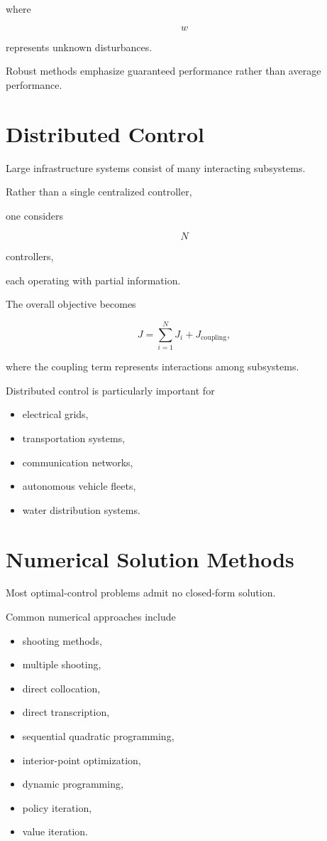 \documentclass[11pt,fleqn]{book}
\numberwithin{equation}{chapter}
\theoremstyle{plain}
\theoremstyle{definition}
\theoremstyle{remark}
\begin{document}
where

\[
w
\]

represents unknown disturbances.

Robust methods emphasize guaranteed performance rather than average
performance.


\section{Distributed Control}

Large infrastructure systems consist of many interacting subsystems.

Rather than a single centralized controller,

one considers

\[
N
\]

controllers,

each operating with partial information.

The overall objective becomes

\[
\boxed{
J
=
\sum_{i=1}^{N}
J_i
+
J_{\mathrm{coupling}},
}
\]

where the coupling term represents interactions among subsystems.

Distributed control is particularly important for

\begin{itemize}
\item electrical grids,
\item transportation systems,
\item communication networks,
\item autonomous vehicle fleets,
\item water distribution systems.
\end{itemize}


\section{Numerical Solution Methods}

Most optimal-control problems admit no closed-form solution.

Common numerical approaches include

\begin{itemize}
\item shooting methods,
\item multiple shooting,
\item direct collocation,
\item direct transcription,
\item sequential quadratic programming,
\item interior-point optimization,
\item dynamic programming,
\item policy iteration,
\item value iteration.
\end{itemize}
\end{document}
